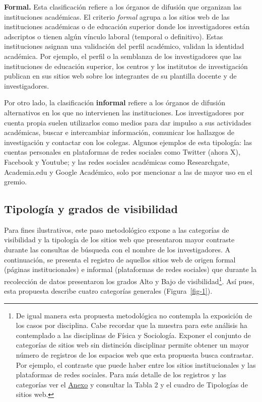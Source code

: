 \documentclass[
  spanish,
  11pt,
  a4paper,
]{scrbook}
\begin{document}
\textbf{Formal.} Esta clasificación refiere a los órganos de difusión
que organizan las instituciones académicas. El criterio \emph{formal}
agrupa a los sitios web de las instituciones académicas o de educación
superior donde los investigadores están adscriptos o tienen algún
vínculo laboral (temporal o definitivo). Estas instituciones asignan una
validación del perfil académico, validan la identidad académica. Por
ejemplo, el perfil o la semblanza de los investigadores que las
instituciones de educación superior, los centros y los institutos de
investigación publican en sus sitios web sobre los integrantes de su
plantilla docente y de investigadores.

Por otro lado, la clasificación \textbf{informal} refiere a los órganos
de difusión alternativos en los que no intervienen las instituciones.
Los investigadores por cuenta propia suelen utilizarlos como medios para
dar impulso a sus actividades académicas, buscar e intercambiar
información, comunicar los hallazgos de investigación y contactar con
los colegas. Algunos ejemplos de esta tipología: las cuentas personales
en plataformas de redes sociales como Twitter (ahora X), Facebook y
Youtube; y las redes sociales académicas como Researchgate, Academia.edu
y Google Académico, solo por mencionar a las de mayor uso en el gremio.

\subsection*{Tipología y grados de
visibilidad}\label{tipologuxeda-y-grados-de-visibilidad}

Para fines ilustrativos, este paso metodológico expone a las categorías
de visibilidad y la tipología de los sitios web que presentaron mayor
contraste durante las consultas de búsqueda con el nombre de los
investigadores. A continuación, se presenta el registro de aquellos
sitios web de origen formal (páginas institucionales) e informal
(plataformas de redes sociales) que durante la recolección de datos
presentaron los grados Alto y Bajo de visibilidad\footnote{De igual
  manera esta propuesta metodológica no contempla la exposición de los
  casos por disciplina. Cabe recordar que la muestra para este análisis
  ha contemplado a las disciplinas de Física y Sociología. Exponer el
  conjunto de categorías de sitios web sin distinción disciplinar
  permite obtener un mayor número de registros de los espacios web que
  esta propuesta busca contrastar. Por ejemplo, el contraste que puede
  haber entre los sitios institucionales y las plataformas de redes
  sociales. Para más detalle de los registros y las categorías ver el
  \hyperref[_gwhg78ljwimr]{\ul{Anexo}} y consultar la Tabla 2 y el
  cuadro de Tipologías de sitios web.}. Así pues, esta propuesta
describe cuatro categorías generales (Figura~\ref{fig-1}).
\end{document}
